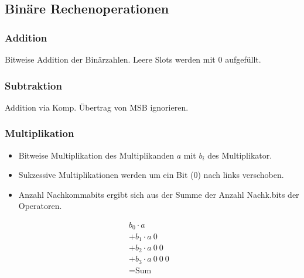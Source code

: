 \subsection{Binäre Rechenoperationen}
\begin{center}
    \begin{minipage}{0.45\linewidth}
        \subsubsection{Addition}
        Bitweise Addition der Binärzahlen. Leere Slots werden mit $0$ aufgefüllt.
    \end{minipage}
    \hfill
    \begin{minipage}{0.45\linewidth}
        \subsubsection{Subtraktion}
        Addition via \twocom Komp. Übertrag von MSB ignorieren.
    \end{minipage}
\end{center}
\subsubsection{Multiplikation}
\begin{center}
    \begin{minipage}{0.70\linewidth}
        \begin{itemize}
            \item Bitweise Multiplikation des Multiplikanden $a$ mit $b_i$ des Multiplikator.
            \item Sukzessive Multiplikationen werden um ein Bit ($0$) nach links verschoben.
            \item Anzahl Nachkommabits ergibt sich aus der Summe der Anzahl Nachk.bits der Operatoren.
        \end{itemize}
    \end{minipage}
    \hfill
    \begin{minipage}{0.25\linewidth}
        \begin{align*}
            b_0 \cdot a&\\
            +b_1 \cdot a~0\\
            +b_2 \cdot a~0~0&\\
            +b_3 \cdot a~0~0~0&\\
            \hline
            =\text{Sum}&
        \end{align*}
    \end{minipage}
\end{center}
